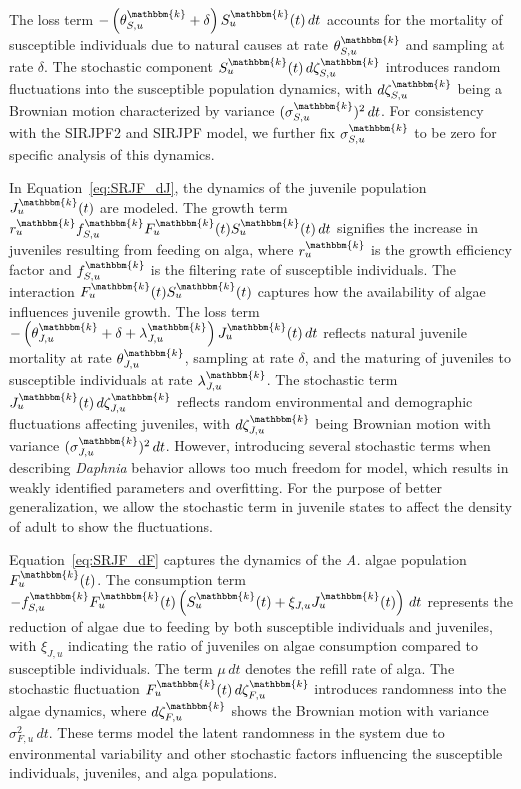 \documentclass[aoas,preprint]{imsart}\usepackage[]{graphicx}\usepackage[]{xcolor}
\newcommand\unit{u}
\newcommand\species{\mathbbm{k}}
\begin{document}
The loss term $-\left(\theta^{\species}_{S,{\unit}}+ \delta\right) S^{\species}_{\unit}(t) \, dt$ accounts for the mortality of susceptible individuals due to natural causes at rate $\theta^{\species}_{S,\unit}$ and sampling at rate $\delta$.
The stochastic component $S^{\species}_{\unit}(t) \, d\zeta^{\species}_{S,\unit}$ introduces random fluctuations into the susceptible population dynamics, with $d\zeta^{\species}_{S,\unit}$ being a Brownian motion characterized by variance $(\sigma^{\species}_{S,{\unit}})^{2}\, dt$.
For consistency with the SIRJPF2 and SIRJPF model, we further fix $\sigma^{\species}_{S,{\unit}}$ to be zero for specific analysis of this dynamics.
\parskip 3mm

In Equation~\eqref{eq:SRJF_dJ}, the dynamics of the juvenile population $J^{\species}_{\unit}(t)$ are modeled. The growth term $r^{\species}_{\unit} f^{\species}_{S,\unit} F^{\species}_{\unit}(t) S^{\species}_{\unit}(t) \, dt$ signifies the increase in juveniles resulting from feeding on alga, where $r^{\species}_{\unit}$ is the growth efficiency factor and $f^{\species}_{S,\unit}$ is the filtering rate of susceptible individuals.
The interaction $F^{\species}_{\unit}(t) S^{\species}_{\unit}(t)$ captures how the availability of algae influences juvenile growth.
The loss term $-\left(\theta^{\species}_{J,\unit} + \delta + \lambda^{\species}_{J,\unit}\right) J^{\species}_{\unit}(t) \, dt$ reflects natural juvenile mortality at rate $\theta^{\species}_{J,\unit}$, sampling at rate $\delta$, and the maturing of juveniles to susceptible individuals at rate $\lambda^{\species}_{J,\unit}$.
The stochastic term $J^{\species}_{\unit}(t) \, d\zeta^{\species}_{J,\unit}$ reflects random environmental and demographic fluctuations affecting juveniles, with $d\zeta^{\species}_{J,\unit}$ being Brownian motion with variance $(\sigma^{\species}_{J,{\unit}})^{2}\, dt$.
However, introducing several stochastic terms when describing \textit{Daphnia} behavior allows too much freedom for model, which results in weakly identified parameters and overfitting.
For the purpose of better generalization, we allow the stochastic term in juvenile states to affect the density of adult to show the fluctuations.
\parskip 3mm

Equation~\eqref{eq:SRJF_dF} captures the dynamics of the \textit{A.} algae population $F^{\species}_{\unit}(t)$.
The consumption term $- f^{\species}_{S,\unit} F^{\species}_{\unit}(t) \left(S^{\species}_{\unit}(t) + \xi_{J,\unit} J^{\species}_{\unit}(t) \right) \, dt$ represents the reduction of algae due to feeding by both susceptible individuals and juveniles, with $\xi_{J,\unit}$ indicating the ratio of juveniles on algae consumption compared to susceptible individuals.
The term $\mu \, dt$ denotes the refill rate of alga.
The stochastic fluctuation $F^{\species}_{\unit}(t) \, d\zeta^{\species}_{F,\unit}$ introduces randomness into the algae dynamics, where $d\zeta^{\species}_{F,\unit}$ shows the Brownian motion with variance $\sigma_{F,{\unit}}^{2}\, dt$.
These terms model the latent randomness in the system due to environmental variability and other stochastic factors influencing the susceptible individuals, juveniles, and alga populations.
\end{document}
